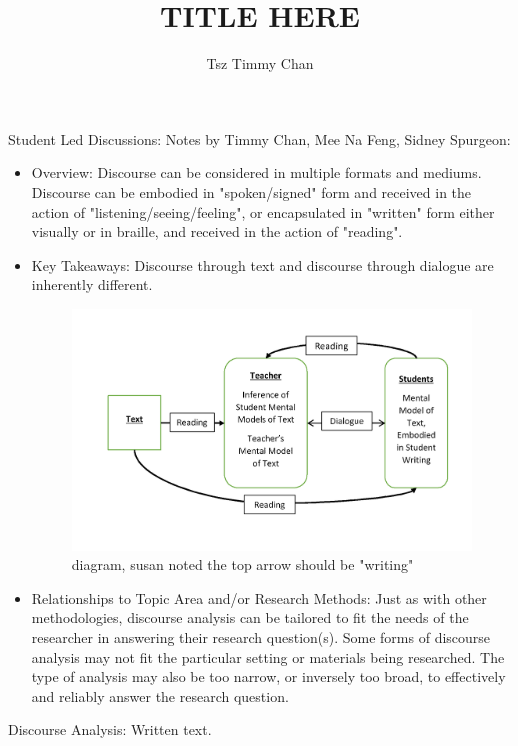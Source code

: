 \documentclass{TC}
\title{TITLE HERE}	%
\author{Tsz Timmy Chan}	%
\begin{document}
Student Led Discussions: 
Notes by Timmy Chan, Mee Na Feng, Sidney Spurgeon:

\begin{itemize}
\item Overview: Discourse can be considered in multiple formats and mediums. Discourse can be embodied in "spoken/signed" form and received in the action of  "listening/seeing/feeling", or encapsulated in "written" form either visually or in braille, and received in the action of "reading".
\item Key Takeaways: Discourse through text and discourse through dialogue are inherently different. 
\begin{figure}[H]
\centering
\includegraphics[width=.75\textwidth]{Discourse_I_diagram}
\caption{diagram, susan noted the top arrow should be "writing"}
\end{figure}

\item Relationships to Topic Area and/or Research Methods: Just as with other methodologies, discourse analysis can be tailored to fit the needs of the researcher in answering their research question(s). Some forms of discourse analysis may not fit the particular setting or materials being researched. The type of analysis may also be too narrow, or inversely too broad, to effectively and reliably answer the research question. 

\end{itemize}
Discourse Analysis: Written text. \parencite{goldman_discourse_2011}
\end{document}
